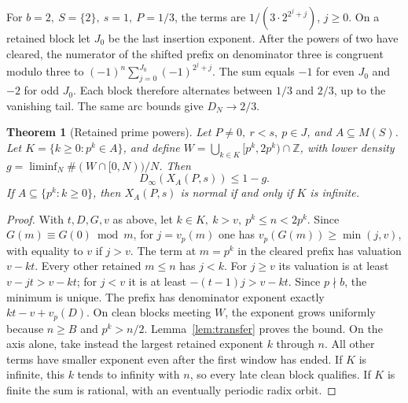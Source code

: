 \documentclass[11pt]{article}
\newtheorem{theorem}{Theorem}[section]
\newcommand{\Z}{\mathbb Z}
\newcommand{\dd}{D_{\infty}}
\begin{document}
For \(b=2,\ S=\{2\},\ s=1,\ P=1/3\), the terms are
\(1/(3\cdot2^{2^j+j})\), \(j\ge0\). On a retained block let \(J_0\) be the last
insertion exponent. After the powers of two have cleared, the numerator of the
shifted prefix on denominator three is congruent modulo three to
\((-1)^n\sum_{j=0}^{J_0}(-1)^{2^j+j}\). The sum equals \(-1\) for even
\(J_0\) and \(-2\) for odd \(J_0\). Each block therefore alternates between
\(1/3\) and \(2/3\), up to the vanishing tail. The same arc bounds give
\(D_N\to2/3\).

\begin{theorem}[Retained prime powers]\label{thm:mask}
Let \(P\ne0,\ r<s,\ p\in J\), and \(A\subseteq M(S)\). Let \(K=\{k\ge0:p^k\in A\}\), and define \(W=\bigcup_{k\in K}[p^k,2p^k)\cap\Z\), with lower density \(g=\liminf_N\#(W\cap[0,N))/N\). Then
\[
 \dd(X_A(P,s))\le 1-g .
\]
If \(A\subseteq\{p^k:k\ge0\}\), then \(X_A(P,s)\) is normal if and only if \(K\) is infinite.
\end{theorem}
\begin{proof}
With \(t,D,G,v\) as above, let \(k\in K,\ k>v,\ p^k\le n<2p^k\). Since \(G(m)\equiv G(0)\bmod m\), for \(j=v_p(m)\) one has \(v_p(G(m))\ge\min(j,v)\), with equality to \(v\) if \(j>v\). The term at \(m=p^k\) in the cleared prefix has valuation \(v-kt\). Every other retained \(m\le n\) has \(j<k\). For \(j\ge v\) its valuation is at least \(v-jt>v-kt\); for \(j<v\) it is at least \(-(t-1)j>v-kt\). Since \(p\nmid b\), the minimum is unique. The prefix has denominator exponent exactly \(kt-v+v_p(D)\). On clean blocks meeting \(W\), the exponent grows uniformly because \(n\ge B\) and \(p^k>n/2\). Lemma~\ref{lem:transfer} proves the bound. On the axis alone, take instead the largest retained exponent \(k\) through \(n\). All other terms have smaller exponent even after the first window has ended. If \(K\) is infinite, this \(k\) tends to infinity with \(n\), so every late clean block qualifies. If \(K\) is finite the sum is rational, with an eventually periodic radix orbit.
\end{proof}
\end{document}
